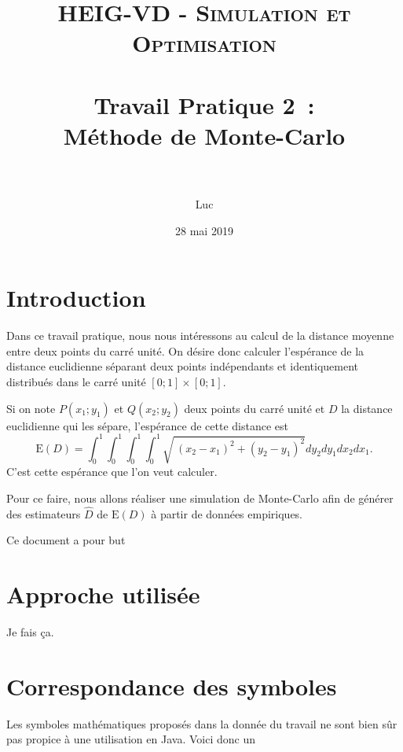 \documentclass[paper=a4, fontsize=11pt]{scrartcl}
\title{
  \normalfont \normalsize
  \textsc{HEIG-VD - Simulation et Optimisation} \\[10pt]
  \horrule{1pt} \\[0.4cm] %
  \huge Travail Pratique 2~:\\Méthode de Monte-Carlo \\
  \horrule{2pt} \\[0.4cm] %
}
\author{Luc \bsc{Wachter}}
\date{28 mai 2019}
\begin{document}
\lstset{language=Java}

\maketitle

\section{Introduction}

Dans ce travail pratique, nous nous intéressons au calcul de la distance moyenne entre deux points du carré unité. On désire donc calculer l'espérance de la distance euclidienne séparant deux points indépendants et identiquement distribués dans le carré unité $[0;1] \times [0;1]$.

Si on note $P(x_1;y_1)$ et $Q(x_2;y_2)$ deux points du carré unité et $D$ la distance euclidienne qui les sépare, l'espérance de cette distance est
\begin{equation*}
  \text{E}(D) = \int _0^1\int _0^1\int _0^1\int _0^1\sqrt{\:\left(x_2-x_1\right)^2+\left(y_2-y_1\right)^2}dy_2dy_1dx_2dx_1.
\end{equation*}
C'est cette espérance que l'on veut calculer.

Pour ce faire, nous allons réaliser une simulation de Monte-Carlo afin de générer des estimateurs $\widehat{D}$ de $\text{E}(D)$ à partir de données empiriques.

Ce document a pour but

\newpage

\section{Approche utilisée}

Je fais ça.

\section{Correspondance des symboles}

Les symboles mathématiques proposés dans la donnée du travail ne sont bien sûr pas propice à une utilisation en Java. Voici donc un

\end{document}
